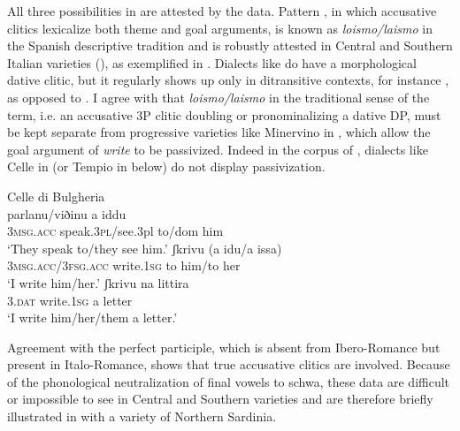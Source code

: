 \documentclass[output=paper,colorlinks,citecolor=brown,nonflat]{./langscibook}
\begin{document}
All three possibilities in  are attested by the data. Pattern , in which accusative clitics lexicalize both theme and goal arguments, is known as \textit{loismo/laismo} in the Spanish descriptive tradition and is robustly attested in Central and Southern Italian varieties (\citealt[§633]{Rohlfs1969}), as exemplified in . Dialects like  do have a morphological dative clitic, but it regularly shows up only in ditransitive contexts, for instance , as opposed to . I agree with \citet{Pineda2016} that \textit{loismo/laismo} in the traditional sense of the term, i.e. an accusative 3P clitic doubling or pronominalizing a dative DP, must be kept separate from progressive varieties like Minervino in , which allow the goal argument of \textit{write} to be passivized. Indeed in the corpus of \citet{ManziniSavoia2005}, dialects like Celle in  (or Tempio in  below) do not display passivization. 

\ea%
    \label{ex:manzini:21}
    Celle di Bulgheria \citep{ManziniSavoia2005}\\
    \ea\label{ex:manzini:21a} 
        {parlanu/viðinu}   {a}   {iddu}\\
        \textsc{3msg.acc}  speak.\textsc{3pl}/see.3pl   to/dom him\\
    \glt ‘They speak to/they see him.’
    \ex\label{ex:manzini:21b} 
           {ʃkrivu}     (a {idu/a} issa)\\
        \textsc{3msg.acc/3fsg.acc} write.\textsc{1sg}   to him/to her\\
    \glt ‘I write him/her.’  
    \ex\label{ex:manzini:21c} 
       {ʃkrivu}     {na} {littira}\\
        \textsc{3.dat}   write.\textsc{1sg}   a letter\\
    \glt ‘I write him/her/them a letter.’
    \z
\z


Agreement with the perfect participle, which is absent from Ibero-Romance but present in Italo-Romance, shows that true accusative clitics are involved. Because of the phonological neutralization of final vowels to schwa, these data are difficult or impossible to see in Central and Southern varieties and are therefore briefly illustrated in  with a variety of Northern Sardinia.
\end{document}
